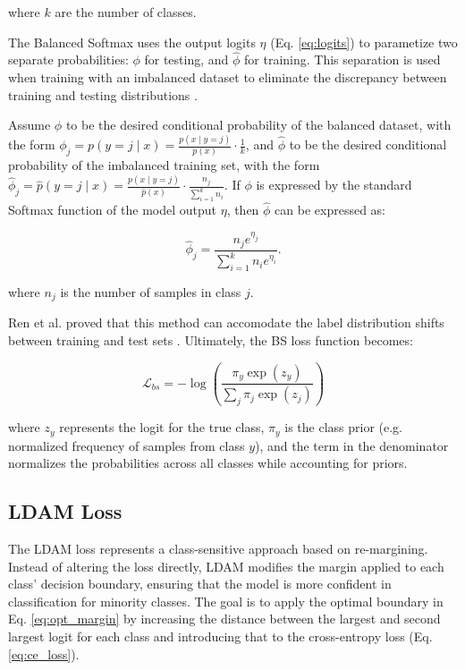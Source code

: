 \noindent where $k$ are the number of classes.

The Balanced Softmax uses the output logits $\eta$ (Eq. \eqref{eq:logits}) to parametize two separate probabilities: $\phi$ for testing, and $\hat{\phi}$ for training. This separation is used when training with an imbalanced dataset to eliminate the discrepancy between training and testing distributions \cite{ren2020balancedmetasoftmaxlongtailedvisual}.

Assume $\phi$ to be the desired conditional probability of the balanced dataset, with the form $\phi_j = p(y = j \mid x) = \frac{p(x \mid y=j)}{p(x)} \cdot \frac{1}{k}$, and $\hat{\phi}$ to be the desired conditional probability of the imbalanced training set, with the form $\hat{\phi}_j = \hat{p}(y = j \mid x) = \frac{p(x \mid y=j)}{\hat{p}(x)} \cdot \frac{n_j}{\sum_{i=1}^{k} n_i}$. If $\phi$ is expressed by the standard Softmax function of the model output $\eta$, then $\hat{\phi}$ can be expressed as:

\begin{equation}
    \hat{\phi}_j = \frac{n_j e^{\eta_j}}{\sum_{i=1}^{k} n_i e^{\eta_i}}.
\end{equation}

\noindent where $n_j$ is the number of samples in class $j$.

Ren et al. \cite{ren2020balancedmetasoftmaxlongtailedvisual} proved that this method can accomodate the label distribution shifts between training and test sets \cite{ren2020balancedmetasoftmaxlongtailedvisual}. Ultimately, the BS loss function becomes:

\begin{equation}
    \mathcal{L}_{bs} = - \log\left( \frac{\pi_y \exp(z_y)}{\sum_j \pi_j \exp(z_j)} \right)
\end{equation}

\noindent where $z_y$ represents the logit for the true class, $\pi_y$ is the class prior (e.g. normalized frequency of samples from class $y$), and the term in the denominator normalizes the probabilities across all classes while accounting for priors.




\subsection{LDAM Loss}
\label{sec:ldam_loss}
The LDAM loss \cite{cao2019learningimbalanceddatasetslabeldistributionaware} represents a class-sensitive approach based on re-margining. Instead of altering the loss directly, LDAM modifies the margin applied to each class' decision boundary, ensuring that the model is more confident in classification for minority classes. The goal is to apply the optimal boundary in Eq. \eqref{eq:opt_margin} by increasing the distance between the largest and second largest logit for each class and introducing that to the cross-entropy loss (Eq. \eqref{eq:ce_loss}).


